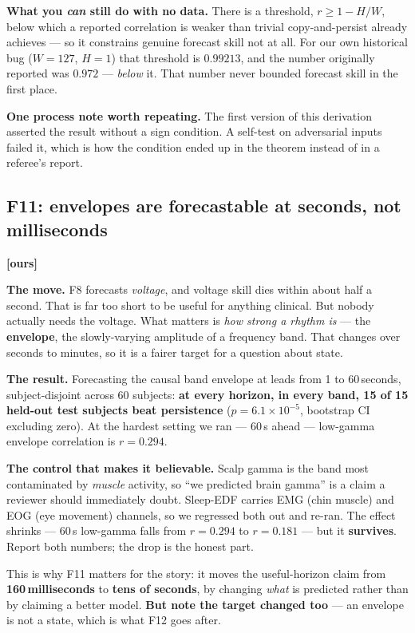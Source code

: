 \documentclass[11pt]{article}
\begin{document}
\textbf{What you \emph{can} still do with no data.} There is a threshold,
$r \geq 1 - H/W$, below which a reported correlation is weaker than trivial
copy-and-persist already achieves --- so it constrains genuine forecast skill not
at all. For our own historical bug ($W=127$, $H=1$) that threshold is $0.99213$,
and the number originally reported was $0.972$ --- \emph{below} it. That number
never bounded forecast skill in the first place.

\textbf{One process note worth repeating.} The first version of this derivation
asserted the result without a sign condition. A self-test on adversarial inputs
failed it, which is how the condition ended up in the theorem instead of in a
referee's report.

\subsection{F11: envelopes are forecastable at seconds, not milliseconds} \textbf{[ours]}

\textbf{The move.} F8 forecasts \emph{voltage}, and voltage skill dies within
about half a second. That is far too short to be useful for anything clinical.
But nobody actually needs the voltage. What matters is \emph{how strong a rhythm
is} --- the \textbf{envelope}, the slowly-varying amplitude of a frequency band.
That changes over seconds to minutes, so it is a fairer target for a question
about state.

\textbf{The result.} Forecasting the causal band envelope at leads from 1 to
60\,seconds, subject-disjoint across 60 subjects: \textbf{at every horizon, in
every band, 15 of 15 held-out test subjects beat persistence}
($p = 6.1\times10^{-5}$, bootstrap CI excluding zero). At the hardest setting we
ran --- 60\,s ahead --- low-gamma envelope correlation is $r = 0.294$.

\textbf{The control that makes it believable.} Scalp gamma is the band most
contaminated by \emph{muscle} activity, so ``we predicted brain gamma'' is a claim
a reviewer should immediately doubt. Sleep-EDF carries EMG (chin muscle) and EOG
(eye movement) channels, so we regressed both out and re-ran. The effect
shrinks --- 60\,s low-gamma falls from $r = 0.294$ to $r = 0.181$ --- but it
\textbf{survives}. Report both numbers; the drop is the honest part.

\begin{keybox}
This is why F11 matters for the story: it moves the useful-horizon claim from
\textbf{160\,milliseconds} to \textbf{tens of seconds}, by changing \emph{what} is
predicted rather than by claiming a better model. \textbf{But note the target
changed too} --- an envelope is not a state, which is what F12 goes after.
\end{keybox}
\end{document}
